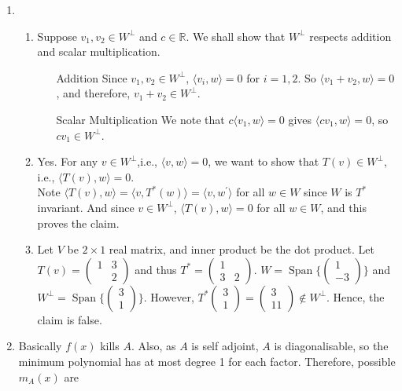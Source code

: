 \documentclass[12pt]{article}
\theoremstyle{definition}
\DeclareMathOperator{\spn}{Span}
\begin{document}
\begin{enumerate}
\item \begin{enumerate}
\item Suppose $v_1,v_2\in W^\perp$ and $c\in \mathbb{R}$. We shall show that $W^\perp$ respects addition and scalar multiplication.
\begin{itemize}
  \item[Addition] Since $v_1,v_2\in W^\perp$, $\langle v_i,w\rangle = 0$ for $i = 1,2$. So $\langle v_1+v_2,w\rangle = 0$, and therefore, $v_1+v_2\in W^\perp$.
  \item[Scalar Multiplication] We note that $c\langle v_1,w\rangle = 0$ gives $\langle cv_1,w\rangle = 0$, so $cv_1\in W^\perp$.
\end{itemize}
\item Yes. For any $v\in W^\perp$,i.e., $\langle v,w\rangle = 0$, we want to show that $T(v)\in W^\perp$, i.e., $\langle T(v),w\rangle = 0$.\\
Note $\langle T(v),w\rangle = \langle v, T^\ast(w)\rangle = \langle v, w^\prime \rangle$ for all $w\in W$ since $W$ is $T^\ast$ invariant. And since $v\in W^\perp$, $\langle T(v),w\rangle = 0$ for all $w\in W$, and this proves the claim.
\item Let $V$ be $2\times 1$ real matrix, and inner product be the dot product. Let $T(v) = \begin{pmatrix}1&3\\&2\end{pmatrix}$ and thus $T^\ast = \begin{pmatrix}1&\\3&2\end{pmatrix}$. $W = \spn\{\begin{pmatrix}1\\-3\end{pmatrix}\}$ and $W^\perp = \spn\{\begin{pmatrix}3\\1\end{pmatrix}\}$. However, $T^\ast\begin{pmatrix}3\\1\end{pmatrix} =\begin{pmatrix}3\\11\end{pmatrix}\not\in W^\perp$. Hence, the claim is false. 
\end{enumerate}
\item Basically $f(x)$ kills $A$. Also, as $A$ is self adjoint, $A$ is diagonalisable, so the minimum polynomial has at most degree 1 for each factor. Therefore, possible $m_A(x)$ are

\end{enumerate}
\end{document}
